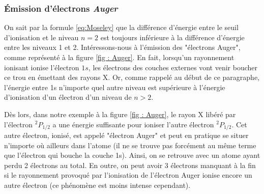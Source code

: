 \subsubsection{Émission d'électrons \emph{Auger}}



On sait par la formule \ref{eq:Moseley} que la différence d'énergie entre le seuil d'ionisation et le niveau $n = 2$ est toujours inférieure à la différence d'énergie entre les niveaux 1 et 2. Intéressons-nous à l'émission des "électrons Auger", comme représenté à la figure \ref{fig : Auger}. En fait, lorsqu'un rayonnement ionisant ionise l'électron $1s$, les électrons des couches externes vont venir boucher ce trou en émettant des rayons X. Or, comme rappelé au début de ce paragraphe, l'énergie entre 1s n'importe quel autre niveau est supérieure à l'énergie d'ionisation d'un électron d'un niveau de $n>2$.

Dès lors, dans notre exemple à la figure \ref{fig : Auger}, le rayon X libéré par l'électron $^2P_{1/2}$ a une énergie suffisante pour ioniser l'autre électron $^2P_{1/2}$. Cet autre électron, ionisé, est appelé "électron Auger" et peut en pratique se situer n'importe où ailleurs dans l'atome (il ne se trouve pas forcément au même terme que l'électron qui bouche la couche 1s). Ainsi, on se retrouve avec un atome ayant perdu 2 électrons au total. En outre, on peut avoir 3 électrons manquant à la fin si le rayonnement provoqué par l'ionisation de l'électron Auger ionise encore un autre électron (ce phénomène est moins intense cependant).

